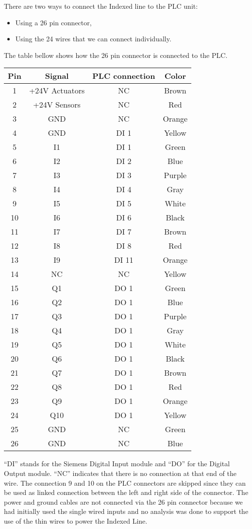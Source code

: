 
There are two ways to connect the Indexed line to the PLC unit:
\begin{itemize}
  \item Using a 26 pin connector,
  \item Using the 24 wires that we can connect individually.
\end{itemize}
The table bellow shows how the 26 pin connector is connected to the PLC.

\begin{center}
\begin{tabular}{ |c|c|c|c| } 
 \hline
 Pin & Signal & PLC connection & Color \\ 
 \hline
  1 & +24V Actuators & NC & Brown \\ 
  2 & +24V Sensors & NC & Red \\ 
  3 & GND & NC & Orange \\ 
  4 & GND & DI 1 & Yellow \\ 
  5 & I1 & DI 1 & Green \\ 
  6 & I2 & DI 2 & Blue \\ 
  7 & I3 & DI 3 & Purple \\ 
  8 & I4 & DI 4 & Gray \\ 
  9 & I5 & DI 5 & White \\ 
  10 & I6 & DI 6 & Black \\ 
  11 & I7 & DI 7 & Brown \\ 
  12 & I8 & DI 8 & Red \\ 
  13 & I9 & DI 11 & Orange \\ 
  14 & NC & NC & Yellow \\ 
  15 & Q1 & DO 1 & Green \\ 
  16 & Q2& DO 1 & Blue \\ 
  17 & Q3 & DO 1 & Purple \\ 
  18 & Q4 & DO 1 & Gray \\ 
  19 & Q5 & DO 1 & White \\ 
  20 & Q6 & DO 1 & Black \\ 
  21 & Q7 & DO 1 & Brown \\ 
  22 & Q8 & DO 1 & Red \\ 
  23 & Q9 & DO 1 & Orange \\ 
  24 & Q10 & DO 1 & Yellow \\ 
  25 & GND & NC & Green \\ 
  26 & GND & NC & Blue \\ 
\hline
\end{tabular}
\end{center}

``DI'' stands for the Siemens Digital Input module and ``DO'' for the Digital Output module.
``NC'' indicates that there is no connection at that end of the wire.
The connection 9 and 10 on the PLC connectors are skipped since they can be used as linked connection between the left and right side of the connector.
The power and ground cables are not connected via the 26 pin connector because we had initially used the single wired inputs and no analysis was done to support the use of the thin wires to power the Indexed Line.